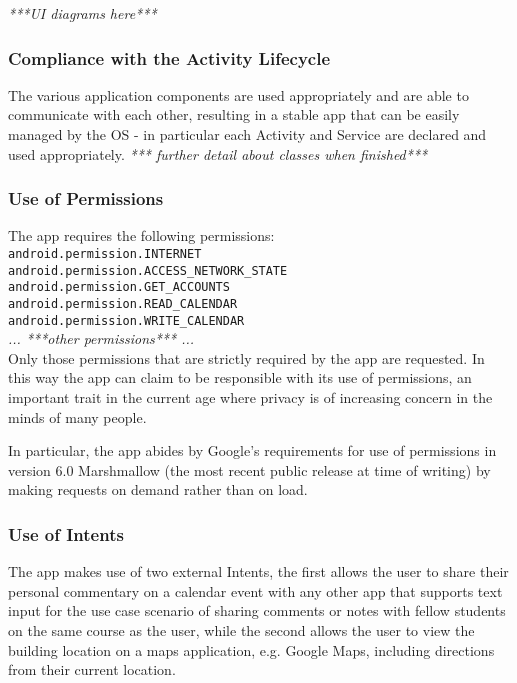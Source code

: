 \documentclass{article}
\def\code#1{\texttt{#1}} %
\begin{document}
\emph{***UI diagrams here***}

\subsubsection{Compliance with the Activity Lifecycle}
The various application components are used appropriately and are able to communicate with each other, resulting in a stable app that can be easily managed by the OS - in particular each Activity and Service are declared and used appropriately. \emph{*** further detail about classes when finished*** }
\subsubsection{Use of Permissions}
The app requires the following permissions:\\
    \newline
    \indent \code{android.permission.INTERNET}\\
    \indent \code{android.permission.ACCESS\_NETWORK\_STATE}\\
    \indent \code{android.permission.GET\_ACCOUNTS}\\
    \indent \code{android.permission.READ\_CALENDAR}\\
    \indent \code{android.permission.WRITE\_CALENDAR}\\
    \indent \emph{... ***other permissions*** ...}\\
    \newline
Only those permissions that are strictly required by the app are requested. In this way the app can claim to be responsible with its use of permissions, an important trait in the current age where privacy is of increasing concern in the minds of many people. 

In particular, the app abides by Google's requirements for use of permissions in version 6.0 Marshmallow (the most recent public release at time of writing) by making requests on demand rather than on load.

\subsubsection{Use of Intents}
The app makes use of two external Intents, the first allows the user to share their personal commentary on a calendar event with any other app that supports text input for the use case scenario of sharing comments or notes with fellow students on the same course as the user, while the second allows the user to view the building location on a maps application, e.g. Google Maps, including directions from their current location.
\end{document}
